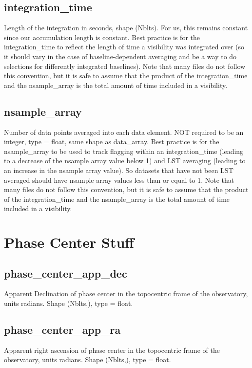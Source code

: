 \documentclass[12pt]{article}
\begin{document}
\subsection{integration\_time}
Length of the integration in seconds, shape (Nblts). 
For us, this remains constant since our accumulation length is constant. 
Best practice is for the integration\_time to reflect the length of time a visibility was integrated over 
(so it should vary in the case of baseline-dependent averaging and be a way to do selections for differently integrated baselines).
Note that many files do not follow this convention, but it is safe to assume that the product of the integration\_time and the nsample\_array is the total amount of time included in a visibility.


\subsection{nsample\_array}
Number of data points averaged into each data element.
NOT required to be an integer, type = float, same shape as data\_array. 
Best practice is for the nsample\_array to be used to track flagging within an integration\_time 
(leading to a decrease of the nsample array value below 1) and LST averaging (leading to an increase in the nsample array value). 
So datasets that have not been LST averaged should have nsample array values less than or equal to 1.
Note that many files do not follow this convention, but it is safe to assume that the product of the integration\_time and the nsample\_array is the total amount of time included in a visibility.


\section{Phase Center Stuff}


\subsection{phase\_center\_app\_dec}
Apparent Declination of phase center in the topocentric frame of the observatory, units radians. Shape (Nblts,), type = float.


\subsection{phase\_center\_app\_ra}
Apparent right ascension of phase center in the topocentric frame of the observatory, units radians. Shape (Nblts,), type = float.
\end{document}
